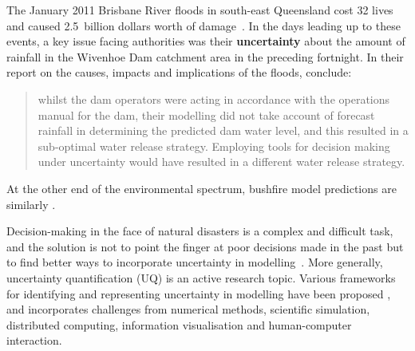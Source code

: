 \documentclass[a4paper,fontsize=12pt]{scrartcl}
\begin{document}

The January 2011 Brisbane River floods in south-east Queensland cost
32 lives and caused 2.5~billion dollars worth of
damage~\parencite{vandenhonert_2011_2011}. In the days leading up to
these events, a key issue facing authorities was their
\textbf{uncertainty} about the amount of rainfall in the Wivenhoe Dam
catchment area in the preceding fortnight. In their report on the
causes, impacts and implications of the floods,
\textcite[p1170]{vandenhonert_2011_2011} conclude: \blockquote{whilst
  the dam operators were acting in accordance with the operations
  manual for the dam, their modelling did not take account of forecast
  rainfall in determining the predicted dam water level, and this
  resulted in a sub-optimal water release strategy. Employing tools
  for decision making under uncertainty would have resulted in a
  different water release strategy.}
At the other end of the environmental spectrum, bushfire model
predictions are similarly .

Decision-making in the face of natural disasters is a complex and
difficult task, and the solution is not to point the finger at poor
decisions made in the past but to find better ways to incorporate
uncertainty in modelling~\cite{thompson_social_2014-1}. More
generally, uncertainty quantification (UQ)
is an active research topic. Various frameworks for identifying and
representing uncertainty in modelling have been
proposed \parencite[for
example]{neale_navigating_2015,maceachren_visual_2015,bonneau_overview_2014}, and incorporates challenges from numerical methods,
scientific simulation, distributed computing, information
visualisation and human-computer interaction. 
\end{document}
